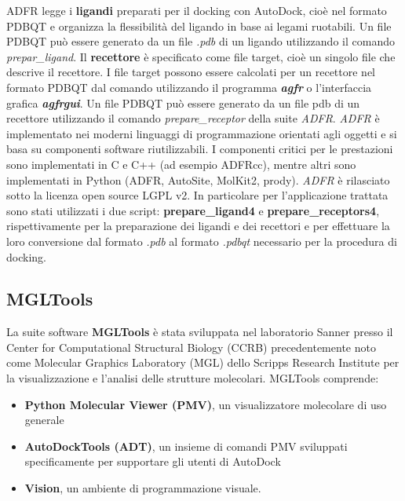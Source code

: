 ADFR legge i \textbf{ligandi} preparati per il docking con AutoDock, cioè nel formato PDBQT e organizza la flessibilità del ligando in base ai legami ruotabili. Un file PDBQT può essere generato da un file \textit{.pdb} di un ligando utilizzando il comando \textit{prepar\_ligand}.  Il \textbf{recettore} è specificato come file target, cioè un singolo file che descrive il recettore. I file target possono essere calcolati per un recettore nel formato PDBQT dal comando utilizzando il programma \textit{\textbf{agfr}} o l'interfaccia grafica \textit{\textbf{agfrgui}}. Un file PDBQT può essere generato da un file pdb di un recettore utilizzando il comando \textit{prepare\_receptor} della suite \textit{ADFR}. \newline
\textit{ADFR} è implementato nei moderni linguaggi di programmazione orientati agli oggetti e si basa su componenti software riutilizzabili. I componenti critici per le prestazioni sono implementati in C e C++ (ad esempio ADFRcc), mentre altri sono implementati in Python (ADFR, AutoSite, MolKit2, prody). \textit{ADFR} è rilasciato sotto la licenza open source LGPL v2.\newline 
In particolare per l'applicazione trattata sono stati utilizzati i due script: \textbf{prepare\_ligand4} e \textbf{prepare\_receptors4}, rispettivamente per la preparazione dei ligandi e dei recettori e per effettuare la loro conversione dal formato \textit{.pdb} al formato \textit{.pdbqt} necessario per la procedura di docking.

\subsection{MGLTools}\label{sec:2.1.3}
La suite software \textbf{MGLTools} è stata sviluppata nel laboratorio Sanner presso il Center for Computational Structural Biology (CCRB) precedentemente noto come Molecular Graphics Laboratory (MGL) dello Scripps Research Institute per la visualizzazione e l'analisi delle strutture molecolari. MGLTools comprende:

\begin{itemize}
    \item \textbf{Python Molecular Viewer (PMV)}, un visualizzatore molecolare di uso generale
    \item \textbf{AutoDockTools (ADT)}, un insieme di comandi PMV sviluppati specificamente per supportare gli utenti di AutoDock
    \item \textbf{Vision}, un ambiente di programmazione visuale.
\end{itemize}

